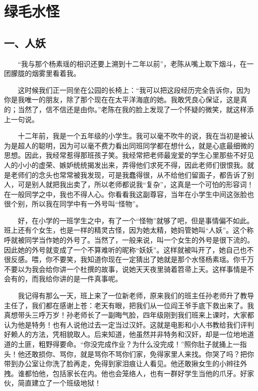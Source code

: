 \chapter{绿毛水怪}


\section{一、人妖}
 
 　　“我与那个杨素瑶的相识还要上溯到十二年以前”，老陈从嘴上取下烟斗，在一团朦胧的烟雾里看着我。 
 
 　　这时候我们正一同坐在公园的长椅上：“我可以把这段经历完全告诉你，因为你是我唯一的朋友，除了那个现在在太平洋海底的她。我敢凭良心保证，这是真的；当然了，信不信还是由你。”老陈在我的脸上发现了一个怀疑的微笑，就这样添上一句说。 
 
 　　十二年前，我是一个五年级的小学生。我可以毫不吹牛的说，我在当初是被认为是超人的聪明，因为可以毫不费力看出同班同学都在想什么，就是心底最细微的思想。因此，我经常惹得那班孩子笑。我经常把老师最宠爱的学生心里那些不好见人的小小的虚荣、嫉妒统统揭发出来，弄得他们求死不得，因此老师们很恨我。就是老师们的念头也常常被我发现，可是我蠢得很，从不给他们留面子，都告诉了别人，可是别人就把我出卖了，所以老师都说我“复杂”，这真是一个可怕的形容词！在一般同学之中，我也不得人心。你看看我这副尊容，当年在小学生中间这张脸也很个别，所以我在同学中有一外号叫“怪物”。 
 
 　　好，在小学的一班学生之中，有了一个“怪物”就够了吧，但是事情偏不如此。班上还有个女生，也是一样的精灵古怪，因为她太精，她妈管她叫“人妖”。这个称呼就被同学当作她的外号了。当然了，一般来说，叫一个女生的外号是很下流的。因此她的外号就变成了一个不算难听的昵称“妖妖”。这样就被叫开了，她自己也不很反感。喂，你不要笑，我知道你现在一定猜出了她就是那个水怪杨素瑶。你千万不要以为我会给你讲一个杜撰的故事，说她天天夜里骑着笤帚上天。这样事情是不会有的，而我给你讲的是一件真事呢。 
 
 　　我记得有那么一天，班上来了一位新老师，原来我们的班主任孙老师升了教导主任了，我们都在感谢上苍：老天有眼，把我们从一位阎王爷手底下救出来了。我真想带头三呼万岁！孙老师长了一副晦气脸，四年级刚到我们班来上课时，大家都认为他是特务！也有人说他过去一定当过汉奸。这就是电影和小人书教给我们评判好赖人的方法，凭相貌取人。后来知道，他虽然并非特务和汉奸，却是一位地地道道的土匪，粗野得要命。“你没完成作业？为什么没完成！”照你肚子就捅上一指头！他还敢损你、骂你，就是骂你不骂你们家，免得家里人来找。你哭了吗？把你带到办公室让你洗了脸再走，免得到家泪痕让人看见。他还敢揪女生的小辫往外拽。谁都怕他，包括家长在内。他也会笼络人，也有一群好学生当他的爪牙。好家伙，简直建立了一个班级地狱！ 
 
